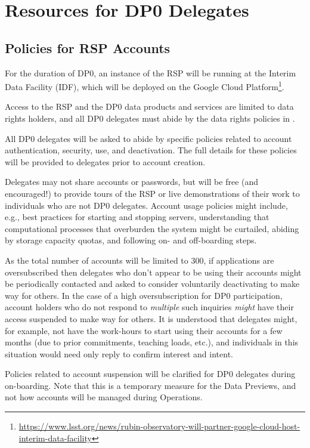 \documentclass[DM,lsstdraft,authoryear,toc]{lsstdoc}
\begin{document}
\section{Resources for DP0 Delegates}\label{sec:res}

\subsection{Policies for RSP Accounts}\label{ssec:res_pol}

For the duration of DP0, an instance of the RSP will be running at the Interim Data Facility (IDF), which will be deployed on the Google Cloud Platform\footnote{\url{https://www.lsst.org/news/rubin-observatory-will-partner-google-cloud-host-interim-data-facility}}.

Access to the RSP and the DP0 data products and services are limited to data rights holders, and all DP0 delegates must abide by the data rights policies in .

All DP0 delegates will be asked to abide by specific policies related to account authentication, security, use, and deactivation.
The full details for these policies will be provided to delegates prior to account creation. 

Delegates may not share accounts or passwords, but will be free (and encouraged!) to provide tours of the RSP or live demonstrations of their work to individuals who are not DP0 delegates.
Account usage policies might include, e.g., best practices for starting and stopping servers, understanding that computational processes that overburden the system might be curtailed, abiding by storage capacity quotas, and following on- and off-boarding steps.

As the total number of accounts will be limited to 300, if applications are oversubscribed then delegates who don't appear to be using their accounts might be periodically contacted and asked to consider voluntarily deactivating to make way for others.
In the case of a high oversubscription for DP0 participation, account holders who do not respond to \emph{multiple} such inquiries \emph{might} have their access suspended to make way for others.
It is understood that delegates might, for example, not have the work-hours to start using their accounts for a few months (due to prior commitments, teaching loads, etc.), and individuals in this situation would need only reply to confirm interest and intent. 

Policies related to account suspension will be clarified for DP0 delegates during on-boarding.
Note that this is a temporary measure for the Data Previews, and not how accounts will be managed during Operations.
\end{document}
